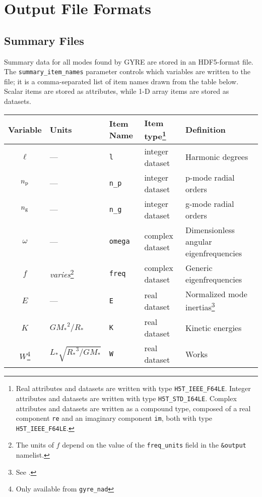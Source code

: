 \documentclass{article}
\newcommand{\Rstar}{\ensuremath{R_{\ast}}}
\newcommand{\Mstar}{\ensuremath{M_{\ast}}}
\newcommand{\Lstar}{\ensuremath{L_{\ast}}}
\begin{document}
\section*{Output File Formats}

\subsection*{Summary Files}

Summary data for all modes found by GYRE are stored in an HDF5-format
file. The \texttt{summary\_item\_names} parameter controls which variables
are written to the file; it is a comma-separated list of item names
drawn from the table below. Scalar items are stored as attributes,
while 1-D array items are stored as datasets.

\begin{center}
\begin{longtable}{cllll} \hline
Variable & Units & Item Name & Item type\footnote{%
\label{foot:data-type}
Real attributes and datasets are written with type \texttt{H5T\_IEEE\_F64LE}. 
Integer attributes and datasets are written with type \texttt{H5T\_STD\_I64LE}. 
Complex attributes and datasets are written as a compound type, composed of a real component \texttt{re} and an imaginary component \texttt{im}, both with type \texttt{H5T\_IEEE\_F64LE}.} & 
Definition \\ \hline
$\ell$ & --- & \texttt{l} & integer dataset & Harmonic degrees \\
$n_{\rm p}$ & --- & \texttt{n\_p} & integer dataset & p-mode radial orders \\
$n_{\rm g}$ & --- & \texttt{n\_g} & integer dataset & g-mode radial orders \\
$\omega$ & ---   & \texttt{omega} & complex dataset & Dimensionless angular eigenfrequencies \\
$f$      & \emph{varies}\footnote{%
\label{foot:freq-units}
The units of $f$ depend on the value of the
\texttt{freq\_units} field in the \texttt{\&output} namelist.} & 
\texttt{freq} & complex dataset & Generic eigenfrequencies \\
$E$ & --- & \texttt{E} & real dataset & Normalized mode inertias\footnote{\label{foot:inertia}See \citet[][his eqn.~13]{ChrDal2012}.} \\
$K$ & $G\Mstar^{2}/\Rstar$ & \texttt{K} & real dataset & Kinetic energies \\
$W$\footnote{%
\label{foot:coeffs-nad}
Only available from \texttt{gyre\_nad}} & $\Lstar \sqrt{\Rstar^{3}/G\Mstar}$ & \texttt{W} & real dataset & Works \\

\end{longtable}
\end{center}
\end{document}
